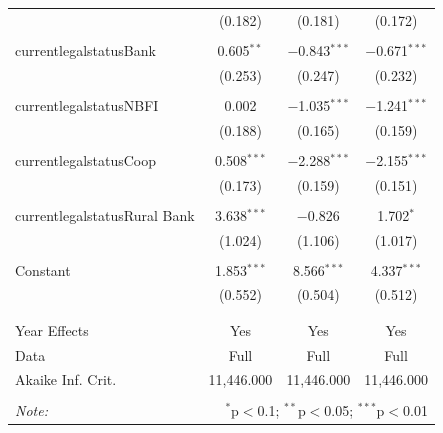 \documentclass[a4paper, nobind]{templates/ociamthesis}
\begin{document}
\begin{table}[!htbp]
\begin{tabular}{@{\extracolsep{5pt}}lccc}
  & (0.182) & (0.181) & (0.172) \\ 
  & & & \\ 
 currentlegalstatusBank & 0.605$^{**}$ & $-$0.843$^{***}$ & $-$0.671$^{***}$ \\ 
  & (0.253) & (0.247) & (0.232) \\ 
  & & & \\ 
 currentlegalstatusNBFI & 0.002 & $-$1.035$^{***}$ & $-$1.241$^{***}$ \\ 
  & (0.188) & (0.165) & (0.159) \\ 
  & & & \\ 
 currentlegalstatusCoop & 0.508$^{***}$ & $-$2.288$^{***}$ & $-$2.155$^{***}$ \\ 
  & (0.173) & (0.159) & (0.151) \\ 
  & & & \\ 
 currentlegalstatusRural Bank & 3.638$^{***}$ & $-$0.826 & 1.702$^{*}$ \\ 
  & (1.024) & (1.106) & (1.017) \\ 
  & & & \\ 
 Constant & 1.853$^{***}$ & 8.566$^{***}$ & 4.337$^{***}$ \\ 
  & (0.552) & (0.504) & (0.512) \\ 
  & & & \\ 
\hline \\[-1.8ex] 
Year Effects & Yes & Yes & Yes \\ 
Data & Full & Full & Full \\ 
Akaike Inf. Crit. & 11,446.000 & 11,446.000 & 11,446.000 \\ 
\hline 
\hline \\[-1.8ex] 
\textit{Note:}  & \multicolumn{3}{r}{$^{*}$p$<$0.1; $^{**}$p$<$0.05; $^{***}$p$<$0.01} \\ 
\end{tabular} 
\end{table}

\newpage
\end{document}
